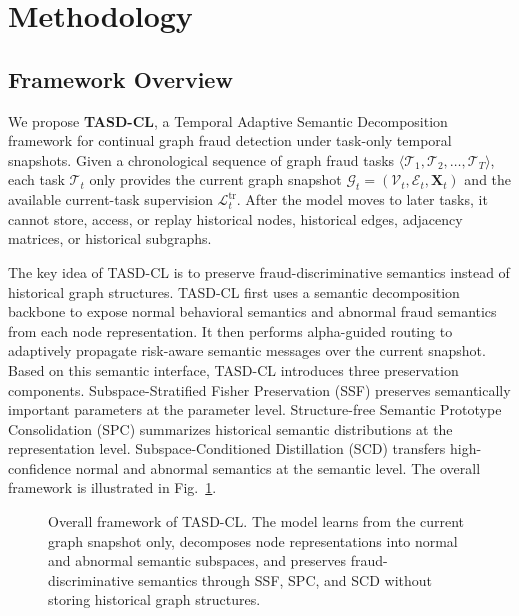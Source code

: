 \section{Methodology}
\label{sec:methodology}

\subsection{Framework Overview}
\label{subsec:framework}

We propose \textbf{TASD-CL}, a Temporal Adaptive Semantic Decomposition framework for continual graph fraud detection under task-only temporal snapshots. Given a chronological sequence of graph fraud tasks $\langle \mathcal{T}_1,\mathcal{T}_2,\ldots,\mathcal{T}_T\rangle$, each task $\mathcal{T}_t$ only provides the current graph snapshot $\mathcal{G}_t=(\mathcal{V}_t,\mathcal{E}_t,\mathbf{X}_t)$ and the available current-task supervision $\mathcal{L}^{\mathrm{tr}}_t$. After the model moves to later tasks, it cannot store, access, or replay historical nodes, historical edges, adjacency matrices, or historical subgraphs.

The key idea of TASD-CL is to preserve fraud-discriminative semantics instead of historical graph structures. TASD-CL first uses a semantic decomposition backbone to expose normal behavioral semantics and abnormal fraud semantics from each node representation. It then performs alpha-guided routing to adaptively propagate risk-aware semantic messages over the current snapshot. Based on this semantic interface, TASD-CL introduces three preservation components. Subspace-Stratified Fisher Preservation (SSF) preserves semantically important parameters at the parameter level. Structure-free Semantic Prototype Consolidation (SPC) summarizes historical semantic distributions at the representation level. Subspace-Conditioned Distillation (SCD) transfers high-confidence normal and abnormal semantics at the semantic level. The overall framework is illustrated in Fig.~\ref{fig:framework}.

\begin{figure}[t]
    \centering
    \caption{Overall framework of TASD-CL. The model learns from the current graph snapshot only, decomposes node representations into normal and abnormal semantic subspaces, and preserves fraud-discriminative semantics through SSF, SPC, and SCD without storing historical graph structures.}
    \label{fig:framework}
\end{figure}

